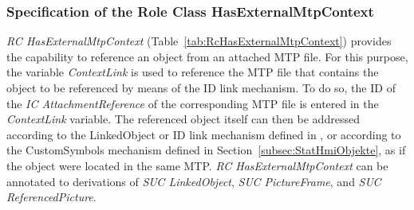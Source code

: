 \subsubsection{Specification of the Role Class HasExternalMtpContext}

\emph{RC HasExternalMtpContext} (Table~\ref{tab:RcHasExternalMtpContext}) provides the capability to reference an object from an attached MTP file. For this purpose, the variable \emph{ContextLink} is used to reference the MTP file that contains the object to be referenced by means of the ID link mechanism. To do so, the ID of the \emph{IC AttachmentReference} of the corresponding MTP file is entered in the \emph{ContextLink} variable. The referenced object itself can then be addressed according to the LinkedObject or ID link mechanism defined in \cite{PNO.2025.Part1}, or according to the CustomSymbols mechanism defined in Section~\ref{subsec:StatHmiObjekte}, as if the object were located in the same MTP. \emph{RC HasExternalMtpContext} can be annotated to derivations of \emph{SUC LinkedObject}, \emph{SUC PictureFrame}, and \emph{SUC ReferencedPicture}. 

